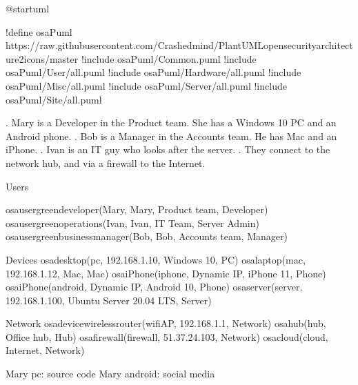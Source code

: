 \documentclass[letterpaper,10pt,english]{sphinxmanual}
\begin{document}
\begin{sphinxVerbatim}[commandchars=\\\{\},numbers=left,firstnumber=1,stepnumber=1]
@startuml

!define osaPuml https://raw.githubusercontent.com/Crashedmind/PlantUML\PYGZhy{}opensecurityarchitecture2\PYGZhy{}icons/master
!include osaPuml/Common.puml
!include osaPuml/User/all.puml
!include osaPuml/Hardware/all.puml
!include osaPuml/Misc/all.puml
!include osaPuml/Server/all.puml
!include osaPuml/Site/all.puml

\PYGZsq{}. Mary is a Developer in the Product team. She has a Windows 10 PC and an Android phone.
\PYGZsq{}. Bob is a Manager in the Accounts team. He has Mac and an iPhone.
\PYGZsq{}. Ivan is an IT guy who looks after the server. 
\PYGZsq{}. They connect to the network hub, and via a firewall to the Internet.


\PYGZsq{} Users

osa\PYGZus{}user\PYGZus{}green\PYGZus{}developer(Mary, \PYGZdq{}Mary\PYGZdq{}, \PYGZdq{}Product team\PYGZdq{}, \PYGZdq{}Developer\PYGZdq{})
osa\PYGZus{}user\PYGZus{}green\PYGZus{}operations(Ivan, \PYGZdq{}Ivan\PYGZdq{}, \PYGZdq{}IT Team\PYGZdq{}, \PYGZdq{}Server Admin\PYGZdq{})
osa\PYGZus{}user\PYGZus{}green\PYGZus{}business\PYGZus{}manager(Bob, \PYGZdq{}Bob\PYGZdq{}, \PYGZdq{}Accounts team\PYGZdq{}, \PYGZdq{}Manager\PYGZdq{})

\PYGZsq{} Devices
osa\PYGZus{}desktop(pc, \PYGZdq{}192.168.1.10\PYGZdq{}, \PYGZdq{}Windows 10\PYGZdq{}, \PYGZdq{}PC\PYGZdq{})
osa\PYGZus{}laptop(mac, \PYGZdq{}192.168.1.12\PYGZdq{}, \PYGZdq{}Mac\PYGZdq{}, \PYGZdq{}Mac\PYGZdq{})
osa\PYGZus{}iPhone(iphone, \PYGZdq{}Dynamic IP\PYGZdq{}, \PYGZdq{}iPhone 11\PYGZdq{}, \PYGZdq{}Phone\PYGZdq{})
osa\PYGZus{}iPhone(android, \PYGZdq{}Dynamic IP\PYGZdq{}, \PYGZdq{}Android 10\PYGZdq{}, \PYGZdq{}Phone\PYGZdq{})
osa\PYGZus{}server(server, \PYGZdq{}192.168.1.100\PYGZdq{}, \PYGZdq{}Ubuntu Server 20.04 LTS\PYGZdq{}, \PYGZdq{}Server\PYGZdq{})

\PYGZsq{} Network
osa\PYGZus{}device\PYGZus{}wireless\PYGZus{}router(wifiAP, \PYGZdq{}192.168.1.1\PYGZdq{}, \PYGZdq{}Network\PYGZdq{})
osa\PYGZus{}hub(hub, \PYGZdq{}Office hub\PYGZdq{}, \PYGZdq{}Hub\PYGZdq{})
osa\PYGZus{}firewall(firewall, \PYGZdq{}51.37.24.103\PYGZdq{}, \PYGZdq{}Network\PYGZdq{})
osa\PYGZus{}cloud(cloud, \PYGZdq{}Internet\PYGZdq{}, \PYGZdq{}Network\PYGZdq{})


Mary \PYGZhy{}\PYGZhy{}\PYGZgt{} pc: source code
Mary \PYGZhy{}\PYGZhy{}\PYGZgt{} android: social media


\end{sphinxVerbatim}
\end{document}
